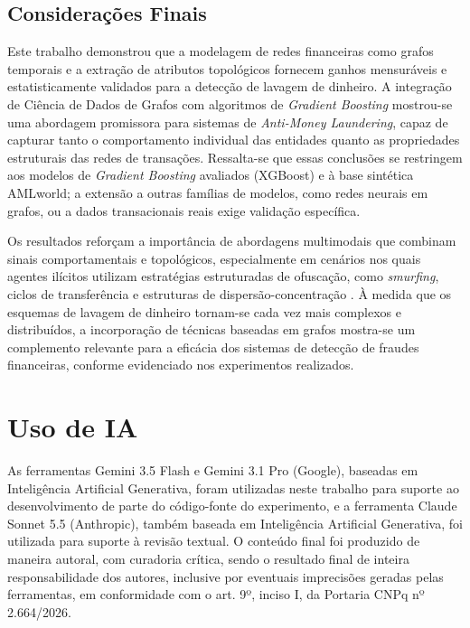 \documentclass[titlepage,a4paper,oneside,onecolumn,12pt]{report}
\begin{document}
\section*{Considerações Finais}

Este trabalho demonstrou que a modelagem de redes financeiras como grafos temporais e a extração de atributos topológicos fornecem ganhos mensuráveis e estatisticamente validados para a detecção de lavagem de dinheiro. A integração de Ciência de Dados de Grafos com algoritmos de \textit{Gradient Boosting} mostrou-se uma abordagem promissora para sistemas de \textit{Anti-Money Laundering}, capaz de capturar tanto o comportamento individual das entidades quanto as propriedades estruturais das redes de transações. Ressalta-se que essas conclusões se restringem aos modelos de \textit{Gradient Boosting} avaliados (XGBoost) e à base sintética AMLworld; a extensão a outras famílias de modelos, como redes neurais em grafos, ou a dados transacionais reais exige validação específica.

Os resultados reforçam a importância de abordagens multimodais que combinam sinais comportamentais e topológicos, especialmente em cenários nos quais agentes ilícitos utilizam estratégias estruturadas de ofuscação, como \textit{smurfing}, ciclos de transferência e estruturas de dispersão-concentração \cite{cheng2025graph, tiwari2020review, chainalysis2025crypto}. À medida que os esquemas de lavagem de dinheiro tornam-se cada vez mais complexos e distribuídos, a incorporação de técnicas baseadas em grafos mostra-se um complemento relevante para a eficácia dos sistemas de detecção de fraudes financeiras, conforme evidenciado nos experimentos realizados.

\chapter*{Uso de IA}

As ferramentas Gemini 3.5 Flash e Gemini 3.1 Pro (Google), baseadas em Inteligência Artificial Generativa, foram utilizadas neste trabalho para suporte ao desenvolvimento de parte do código-fonte do experimento, e a ferramenta Claude Sonnet 5.5 (Anthropic), também baseada em Inteligência Artificial Generativa, foi utilizada para suporte à revisão textual. O conteúdo final foi produzido de maneira autoral, com curadoria crítica, sendo o resultado final de inteira responsabilidade dos autores, inclusive por eventuais imprecisões geradas pelas ferramentas, em conformidade com o art. 9º, inciso I, da Portaria CNPq nº 2.664/2026.



\end{document}
